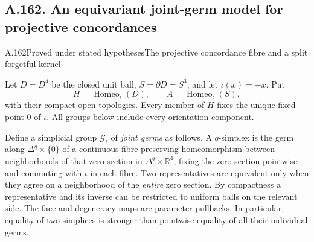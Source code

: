 \subsection{A.162. An equivariant joint-germ model for projective concordances}

\begin{saresult}{A.162}{Proved under stated hypotheses}{The projective concordance fibre and a split forgetful kernel}

Let $D=D^4$ be the closed unit ball, $S=\partial D=S^3$, and let
$\iota(x)=-x$. Put
\[
 H=\operatorname{Homeo}_{\iota}(D),\qquad
 A=\operatorname{Homeo}_{\iota}(S),
\]
with their compact-open topologies. Every member of $H$ fixes the unique
fixed point $0$ of $\iota$. All groups below include every orientation
component.

Define a simplicial group $\mathcal G_{\iota}$ of \emph{joint germs} as follows.
A $q$-simplex is the germ along $\Delta^q\times\{0\}$ of a continuous
fibre-preserving homeomorphism between neighborhoods of that zero section
in $\Delta^q\times\mathbb R^4$, fixing the zero section pointwise and
commuting with $\iota$ in each fibre. Two representatives are equivalent
only when they agree on a neighborhood of the \emph{entire} zero section.
By compactness a representative and its inverse can be restricted to
uniform balls on the relevant side. The face and degeneracy maps are
parameter pullbacks. In particular, equality of two simplices is stronger
than pointwise equality of all their individual germs.


\end{saresult}
